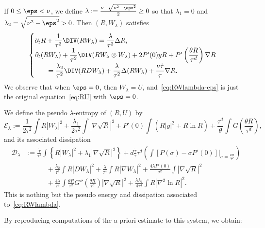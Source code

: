\begin{rema}\label{rem:RWlambda-eps}
If $0 \le \eps < \nu$, we define $\lambda := \frac{\nu - \sqrt{\nu^2 - \eps^2}}{2} \ge 0$ so that $\lambda_1 = 0$ and $\lambda_2 = \sqrt{\nu^2 - \eps^2} >0$. Then $(R, W_{\lambda})$ satisfies
\begin{equation}\label{eq:RWlambda-eps}
\begin{cases}
\partial_t R + \dfrac{1}{\tau^2}\DIV(R W_{\lambda})=\dfrac{\lambda}{\tau^2} \Delta R,\\
\partial_t (R W_{\lambda}) + \dfrac{1}{\tau^2} \DIV (R W_{\lambda} \otimes W_{\lambda}) + 2 P'(0) y R + P' \left(\dfrac{\theta R}{\tau^d} \right) \nabla R \\
\qquad = \dfrac{\lambda_2}{\tau^2} \DIV(R D W_{\lambda}) +\dfrac{\lambda}{\tau^2} \Delta(R W_{\lambda}) + \dfrac{\nu \dot \tau}{\tau}\nabla R.
\end{cases}
\end{equation}
We observe that when $\eps = 0$, then $W_{\lambda} = U$, and~\eqref{eq:RWlambda-eps} is just the original equation~\eqref{eq:RU} with $\eps = 0$.
\end{rema}

We define the pseudo $\lambda$-entropy of $(R,U)$ by
\begin{equation*}
\mathcal E_\lambda :=
\frac{1}{2\tau^2}\int R|W_\lambda|^2 +\frac{\lambda_1}{2\tau^2} \int|\nabla \sqrt R|^2 + P'(0)\int (R|y|^2 + R \ln R) + \frac{\tau^d}{\theta}\int G\left(\frac{\theta R}{\tau^d}\right),
\end{equation*}
and its associated dissipation
\begin{align*}
\mathcal D_\lambda &:= \frac{\dot \tau}{\tau^3}\int \left\{ R |W_\lambda|^2 + \lambda_1 |\nabla \sqrt R|^2 \right\} + d\frac{\dot \tau}{\tau} \tau^d \left(\int \left[P\left(\sigma\right) -\sigma P'(0) \right] \big|_{\sigma= \frac{\theta R}{\tau^d}} \right) \\
&\qquad\quad + \frac{\lambda_2}{\tau^4} \int R |D W_\lambda|^2 + \frac{\lambda}{\tau^4} \int R |\nabla W_\lambda|^2 + \frac{4\lambda P'(0)}{\tau^2} \int |\nabla \sqrt R|^2 \\
&\qquad\quad + \frac{4\lambda}{\tau^2} \int \frac{\theta R}{\tau^d} G'' \left(\tfrac{\theta R}{\tau^d} \right) |\nabla \sqrt R|^2 + \frac{\lambda \lambda_1}{4 \tau^4} \int R |\nabla^2 \ln R |^2.
\end{align*}
This is nothing but the pseudo energy and dissipation associated to~\eqref{eq:RWlambda}.

By reproducing computations of the a priori estimate to this system, we obtain:

